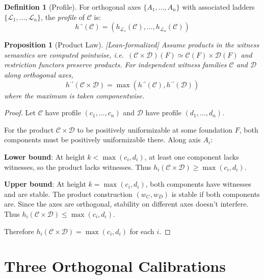 \documentclass[11pt]{article}
\theoremstyle{plain}
\newtheorem{proposition}[theorem]{Proposition}
\theoremstyle{definition}
\newtheorem{definition}[theorem]{Definition}
\newcommand{\leanok}{\textsf{\textcolor{green!70!black}{[Lean-formalized]}}}
\begin{document}
\begin{definition}[Profile]\label{def:profile}
For orthogonal axes $\{A_1, \ldots, A_n\}$ with associated ladders $\{\mathcal{L}_1, \ldots, \mathcal{L}_n\}$, the \emph{profile} of $\mathcal{C}$ is:
\[
h^{\vec{}}(\mathcal{C}) = (h_{\mathcal{L}_1}(\mathcal{C}), \ldots, h_{\mathcal{L}_n}(\mathcal{C}))
\]
\end{definition}

\begin{proposition}[Product Law]\label{prop:product} \leanok
Assume products in the witness semantics are computed pointwise, i.e.\ $(\mathcal C\times\mathcal D)(F)\simeq \mathcal C(F)\times \mathcal D(F)$ and restriction functors preserve products. For independent witness families $\mathcal{C}$ and $\mathcal{D}$ along orthogonal axes,
\[
h^{\vec{}}(\mathcal{C} \times \mathcal{D}) = \max(h^{\vec{}}(\mathcal{C}), h^{\vec{}}(\mathcal{D}))
\]
where the maximum is taken componentwise.
\end{proposition}

\begin{proof}
Let $\mathcal{C}$ have profile $(c_1, \ldots, c_n)$ and $\mathcal{D}$ have profile $(d_1, \ldots, d_n)$.

For the product $\mathcal{C} \times \mathcal{D}$ to be positively uniformizable at some foundation $F$, both components must be positively uniformizable there. Along axis $A_i$:

\textbf{Lower bound}: At height $k < \max(c_i, d_i)$, at least one component lacks witnesses, so the product lacks witnesses. Thus $h_i(\mathcal{C} \times \mathcal{D}) \geq \max(c_i, d_i)$.

\textbf{Upper bound}: At height $k = \max(c_i, d_i)$, both components have witnesses and are stable. The product construction $(w_C, w_D)$ is stable if both components are. Since the axes are orthogonal, stability on different axes doesn't interfere. Thus $h_i(\mathcal{C} \times \mathcal{D}) \leq \max(c_i, d_i)$.

Therefore $h_i(\mathcal{C} \times \mathcal{D}) = \max(c_i, d_i)$ for each $i$.
\end{proof}

\section{Three Orthogonal Calibrations}
\end{document}
